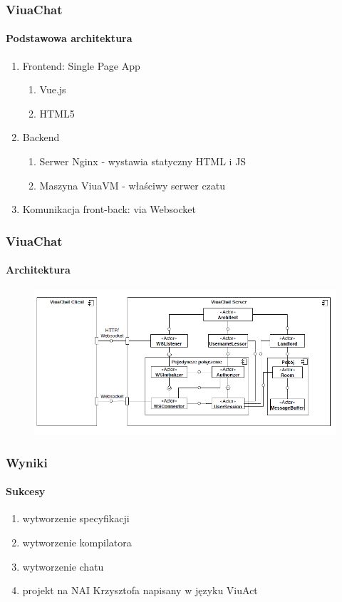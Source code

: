\documentclass[aspectratio=169]{beamer}
\begin{document}
\begin{frame}
    \frametitle{ViuaChat}
    \framesubtitle{Podstawowa architektura}

    \begin{enumerate}
        \item Frontend: Single Page App
        \begin{enumerate}
        	\item Vue.js
        	\item HTML5
        \end{enumerate}
        \item Backend
        \begin{enumerate}
        	\item Serwer Nginx - wystawia statyczny HTML i JS
        	\item Maszyna ViuaVM - właściwy serwer czatu
        \end{enumerate}
        \item Komunikacja front-back: via Websocket
    \end{enumerate}
\end{frame}

\begin{frame}
    \frametitle{ViuaChat}
    \framesubtitle{Architektura}

    \begin{figure}[!htp]
        \centering
        \includegraphics[width=\textwidth]{pckdiag}
    \end{figure}
\end{frame}

\begin{frame}
    \frametitle{Wyniki}
    \framesubtitle{Sukcesy}

    \begin{enumerate}
        \item wytworzenie specyfikacji
        \item wytworzenie kompilatora
        \item wytworzenie chatu
        \item projekt na NAI Krzysztofa napisany w języku ViuAct
    \end{enumerate}
\end{frame}
\end{document}
